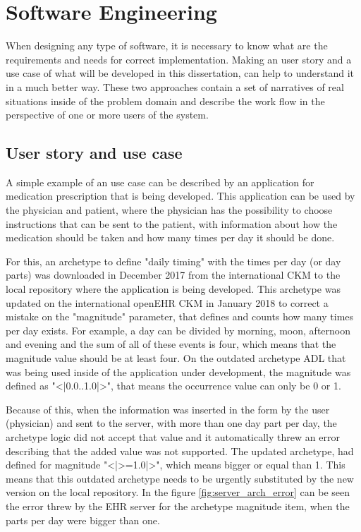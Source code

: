 \documentclass[mim_thesis.tex]{subfiles}
\begin{document}
\section{Software Engineering}
When designing any type of software, it is necessary to know what are the requirements and needs for correct implementation. Making an user story and a use case of what will be developed in this dissertation, can help to understand it in a much better way. These two approaches contain a set of narratives of real situations inside of the problem domain and describe the work flow in the perspective of one or more users of the system.  

\subsection{User story and use case}

A simple example of an use case can be described by an application for medication prescription that is being developed. This application can be used by the physician and patient, where the physician has the possibility to choose instructions that can be sent to the patient, with information about how the medication should be taken and how many times per day it should be done. 

For this, an archetype to define "daily timing" with the times per day (or day parts) was downloaded in December 2017 from the international CKM to the local repository where the application is being developed. This archetype was updated on the international openEHR CKM in January 2018 to correct a mistake on the "magnitude" parameter, that defines and counts how many times per day exists. For example, a day can be divided by morning, moon, afternoon and evening and the sum of all of these events is four, which means that the magnitude value should be at least four. On the outdated archetype ADL that was being used inside of the application under development, the magnitude was defined as "<|0.0..1.0|>", that means the occurrence value can only be 0 or 1. 

Because of this, when the information was inserted in the form by the user (physician) and sent to the server, with more than one day part per day, the archetype logic did not accept that value and it automatically threw an error describing that the added value was not supported. The updated archetype, had defined for magnitude "<|>=1.0|>", which means bigger or equal than 1. This means that this outdated archetype needs to be urgently substituted by the new version on the local repository. In the figure \ref{fig:server_arch_error} can be seen the error threw by the EHR server for the archetype magnitude item, when the parts per day were bigger than one.
\end{document}
